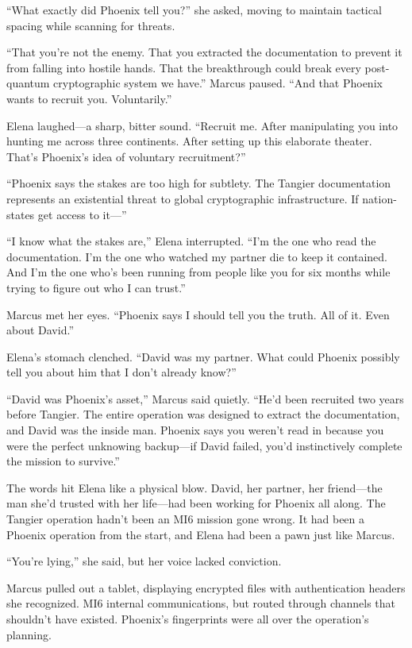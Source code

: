 \documentclass[12pt,letterpaper]{book}
\begin{document}
``What exactly did Phoenix tell you?'' she asked, moving to maintain tactical spacing while scanning for threats.

``That you're not the enemy. That you extracted the documentation to prevent it from falling into hostile hands. That the breakthrough could break every post-quantum cryptographic system we have.'' Marcus paused. ``And that Phoenix wants to recruit you. Voluntarily.''

Elena laughed---a sharp, bitter sound. ``Recruit me. After manipulating you into hunting me across three continents. After setting up this elaborate theater. That's Phoenix's idea of voluntary recruitment?''

``Phoenix says the stakes are too high for subtlety. The Tangier documentation represents an existential threat to global cryptographic infrastructure. If nation-states get access to it---''

``I know what the stakes are,'' Elena interrupted. ``I'm the one who read the documentation. I'm the one who watched my partner die to keep it contained. And I'm the one who's been running from people like you for six months while trying to figure out who I can trust.''

Marcus met her eyes. ``Phoenix says I should tell you the truth. All of it. Even about David.''

Elena's stomach clenched. ``David was my partner. What could Phoenix possibly tell you about him that I don't already know?''

``David was Phoenix's asset,'' Marcus said quietly. ``He'd been recruited two years before Tangier. The entire operation was designed to extract the documentation, and David was the inside man. Phoenix says you weren't read in because you were the perfect unknowing backup---if David failed, you'd instinctively complete the mission to survive.''

The words hit Elena like a physical blow. David, her partner, her friend---the man she'd trusted with her life---had been working for Phoenix all along. The Tangier operation hadn't been an MI6 mission gone wrong. It had been a Phoenix operation from the start, and Elena had been a pawn just like Marcus.

``You're lying,'' she said, but her voice lacked conviction.

Marcus pulled out a tablet, displaying encrypted files with authentication headers she recognized. MI6 internal communications, but routed through channels that shouldn't have existed. Phoenix's fingerprints were all over the operation's planning.
\end{document}
